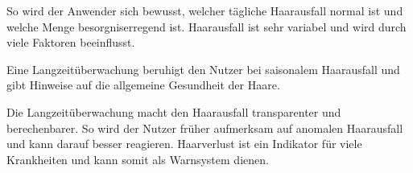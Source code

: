 \documentclass[german,a4paper,12pt]{llncs}
\begin{document}
So wird der Anwender sich bewusst, welcher tägliche Haarausfall normal ist und welche Menge besorgniserregend ist. Haarausfall ist sehr variabel und wird durch viele Faktoren beeinflusst. 

Eine Langzeitüberwachung beruhigt den Nutzer bei saisonalem Haarausfall und gibt Hinweise auf die allgemeine Gesundheit der Haare. 

Die Langzeitüberwachung macht den Haarausfall transparenter und berechenbarer. So wird der Nutzer früher aufmerksam auf anomalen Haarausfall und kann darauf besser reagieren. Haarverlust ist ein Indikator für viele Krankheiten und kann somit als Warnsystem dienen.





\newpage
\printbibliography
\end{document}
